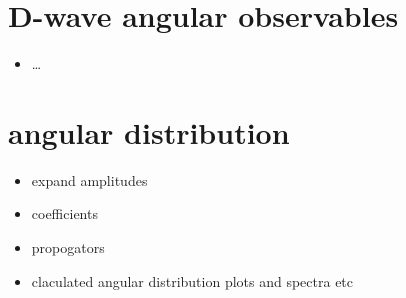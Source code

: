 \section{ D-wave angular observables }






\begin{itemize}
    \item \dots
\end{itemize}

\section{angular distribution}

\begin{itemize}
\item expand amplitudes
\item coefficients
\item propogators
\item claculated angular distribution plots and \psq spectra etc
\end{itemize}


